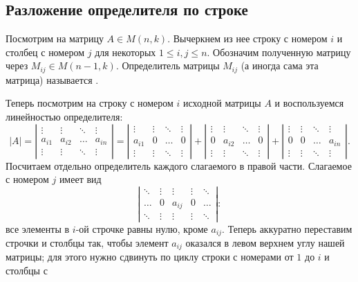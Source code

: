 \subsection{Разложение определителя по строке}

Посмотрим на матрицу $A\in M(n,k)$. Вычеркнем из нее строку с номером
$i$ и столбец с номером $j$ для некоторых $1\leq i,j\leq
n$. Обозначим полученную матрицу через $M_{ij}\in M(n-1,k)$.
Определитель матрицы $M_{ij}$ (а иногда сама эта матрица) называется
.

Теперь посмотрим на строку с номером $i$ исходной матрицы $A$ и
воспользуемся линейностью определителя:
$$
|A| = 
\left|\begin{matrix}\vdots & \vdots & \ddots & \vdots\\
a_{i1} & a_{i2} & \dots & a_{in}\\
\vdots & \vdots & \ddots & \vdots\end{matrix}\right|
= 
\left|\begin{matrix}\vdots & \vdots & \ddots & \vdots\\
a_{i1} & 0 & \dots & 0\\
\vdots & \vdots & \ddots & \vdots\end{matrix}\right| + 
\left|\begin{matrix}\vdots & \vdots & \ddots & \vdots\\
0 & a_{i2} & \dots & 0\\
\vdots & \vdots & \ddots & \vdots\end{matrix}\right| + 
\left|\begin{matrix}\vdots & \vdots & \ddots & \vdots\\
0 & 0 & \dots & a_{in}\\
\vdots & \vdots & \ddots & \vdots\end{matrix}\right|.
$$
Посчитаем отдельно определитель каждого слагаемого в правой части.
Слагаемое с номером $j$ имеет вид
$$
\left|\begin{matrix}\ddots & \vdots & \vdots & \vdots & \ddots\\
\dots & 0 & a_{ij} & 0 & \dots\\
\ddots & \vdots & \vdots & \vdots & \ddots\end{matrix}\right|:
$$
все элементы в $i$-ой строчке равны нулю, кроме $a_{ij}$.
Теперь аккуратно переставим строчки и столбцы так, чтобы элемент
$a_{ij}$ оказался в левом верхнем углу нашей матрицы; для этого
нужно сдвинуть по циклу строки с номерами от $1$ до $i$ и столбцы с
